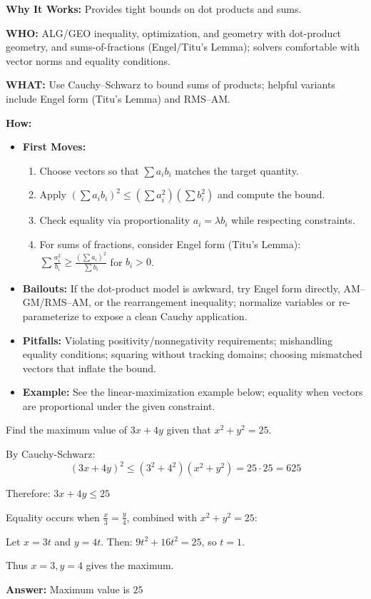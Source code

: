 \documentclass[12pt]{article}
\newenvironment{problem}[1]
{\begin{tcolorbox}[colback=blue!5!white,colframe=blue!75!black,title={#1}]}{\end{tcolorbox}}
\newenvironment{solution}
{\begin{tcolorbox}[colback=green!5!white,colframe=green!75!black,title={Solution}]}{\end{tcolorbox}}
\begin{document}
\textbf{Why It Works:} Provides tight bounds on dot products and sums.

\textbf{WHO:} ALG/GEO inequality, optimization, and geometry with dot-product geometry, and sums-of-fractions (Engel/Titu's Lemma); solvers comfortable with vector norms and equality conditions.

\textbf{WHAT:} Use Cauchy–Schwarz to bound sums of products; helpful variants include Engel form (Titu's Lemma) and RMS–AM.


\textbf{How:}
\begin{itemize}
    \item \textbf{First Moves:}
    \begin{enumerate}[nosep]
        \item Choose vectors so that \(\sum a_i b_i\) matches the target quantity.
        \item Apply \((\sum a_i b_i)^2 \le (\sum a_i^2)(\sum b_i^2)\) and compute the bound.
        \item Check equality via proportionality \(a_i = \lambda b_i\) while respecting constraints.
        \item For sums of fractions, consider Engel form (Titu's Lemma): \(\sum \tfrac{a_i^2}{b_i} \ge \tfrac{(\sum a_i)^2}{\sum b_i}\) for \(b_i>0\).
    \end{enumerate}
    \item \textbf{Bailouts:} If the dot-product model is awkward, try Engel form directly, AM–GM/RMS–AM, or the rearrangement inequality; normalize variables or re-parameterize to expose a clean Cauchy application.
    \item \textbf{Pitfalls:} Violating positivity/nonnegativity requirements; mishandling equality conditions; squaring without tracking domains; choosing mismatched vectors that inflate the bound.
    \item \textbf{Example:} See the linear-maximization example below; equality when vectors are proportional under the given constraint.
\end{itemize}

\begin{problem}{Example: Maximum Value}
Find the maximum value of $3x + 4y$ given that $x^2 + y^2 = 25$.
\end{problem}

\begin{solution}
By Cauchy-Schwarz:
$$(3x + 4y)^2 \leq (3^2 + 4^2)(x^2 + y^2) = 25 \cdot 25 = 625$$

Therefore: $3x + 4y \leq 25$

Equality occurs when $\frac{x}{3} = \frac{y}{4}$, combined with $x^2 + y^2 = 25$:

Let $x = 3t$ and $y = 4t$. Then: $9t^2 + 16t^2 = 25$, so $t = 1$.

Thus $x = 3, y = 4$ gives the maximum.

\textbf{Answer:} Maximum value is $25$
\end{solution}
\end{document}
